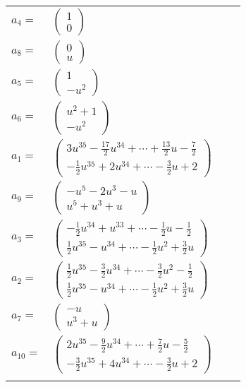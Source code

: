 \documentclass[1p]{elsarticle_modified}
\theoremstyle{definition}
\begin{document}
\begin{tabular}{m{7pt} m{180pt} m{7pt} m{180pt} }
\flushright $a_{4}=$&$\begin{pmatrix}1\\0\end{pmatrix}$ \\
\flushright $a_{8}=$&$\begin{pmatrix}0\\u\end{pmatrix}$ \\
\flushright $a_{5}=$&$\begin{pmatrix}1\\- u^2\end{pmatrix}$ \\
\flushright $a_{6}=$&$\begin{pmatrix}u^2+1\\- u^2\end{pmatrix}$ \\
\flushright $a_{1}=$&$\begin{pmatrix}3 u^{35}-\frac{17}{2} u^{34}+\cdots+\frac{13}{2} u-\frac{7}{2}\\-\frac{1}{2} u^{35}+2 u^{34}+\cdots-\frac{3}{2} u+2\end{pmatrix}$ \\
\flushright $a_{9}=$&$\begin{pmatrix}- u^5-2 u^3- u\\u^5+u^3+u\end{pmatrix}$ \\
\flushright $a_{3}=$&$\begin{pmatrix}-\frac{1}{2} u^{34}+u^{33}+\cdots-\frac{1}{2} u-\frac{1}{2}\\\frac{1}{2} u^{35}- u^{34}+\cdots-\frac{1}{2} u^2+\frac{3}{2} u\end{pmatrix}$ \\
\flushright $a_{2}=$&$\begin{pmatrix}\frac{1}{2} u^{35}-\frac{3}{2} u^{34}+\cdots-\frac{3}{2} u^2-\frac{1}{2}\\\frac{1}{2} u^{35}- u^{34}+\cdots-\frac{1}{2} u^2+\frac{3}{2} u\end{pmatrix}$ \\
\flushright $a_{7}=$&$\begin{pmatrix}- u\\u^3+u\end{pmatrix}$ \\
\flushright $a_{10}=$&$\begin{pmatrix}2 u^{35}-\frac{9}{2} u^{34}+\cdots+\frac{7}{2} u-\frac{5}{2}\\-\frac{3}{2} u^{35}+4 u^{34}+\cdots-\frac{3}{2} u+2\end{pmatrix}$\\&\end{tabular}
\end{document}
